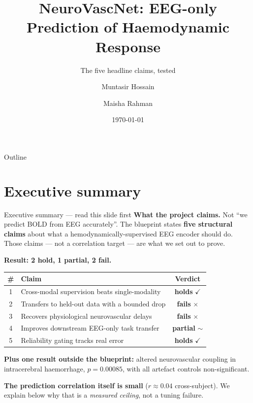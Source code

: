 \documentclass[aspectratio=169,11pt]{beamer}
\title[NeuroVascNet]{NeuroVascNet: EEG-only Prediction of Haemodynamic Response}
\subtitle{The five headline claims, tested}
\author[Hossain \& Rahman]{Muntasir Hossain \and Maisha Rahman}
\date{\today}
\newcommand{\yes}{\textcolor{good}{\ensuremath{\checkmark}}}
\newcommand{\no}{\textcolor{bad}{\ensuremath{\times}}}
\newcommand{\pmark}{\textcolor{warn}{\ensuremath{\sim}}}
\begin{document}
\frame{\titlepage}

\begin{frame}{Outline}\tableofcontents\end{frame}

\section{Executive summary}
\begin{frame}{Executive summary --- read this slide first}
\textbf{What the project claims.} Not ``we predict BOLD from EEG accurately''.
The blueprint states \textbf{five structural claims} about what a
hemodynamically-supervised EEG encoder should do. Those claims --- not a
correlation target --- are what we set out to prove.

\vspace{0.5em}
\textbf{Result: 2 hold, 1 partial, 2 fail.}
\begin{center}\small
\begin{tabular}{clc}
\toprule
\# & Claim & Verdict \\
\midrule
1 & Cross-modal supervision beats single-modality      & \textbf{holds} \yes \\
2 & Transfers to held-out data with a bounded drop     & \textbf{fails} \no \\
3 & Recovers physiological neurovascular delays        & \textbf{fails} \no \\
4 & Improves downstream EEG-only task transfer         & \textbf{partial} \pmark \\
5 & Reliability gating tracks real error               & \textbf{holds} \yes \\
\bottomrule
\end{tabular}
\end{center}

\vspace{0.5em}
\textbf{Plus one result outside the blueprint:} altered neurovascular coupling in
intracerebral haemorrhage, $p=0.00085$, with all artefact controls
non-significant.

\vspace{0.4em}
\textcolor{bad}{\textbf{The prediction correlation itself is small}} ($r\approx0.04$
cross-subject). We explain below why that is a \emph{measured ceiling}, not a
tuning failure.
\end{frame}

\end{document}
